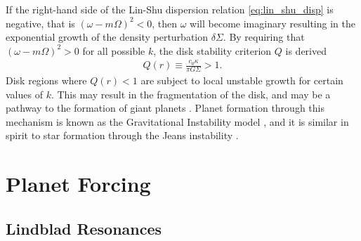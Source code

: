 If the right-hand side of the Lin-Shu dispersion relation \ref{eq:lin_shu_disp} is negative, that is $(\omega - m \Omega)^2 < 0$, then $\omega$ will become imaginary resulting in the exponential growth of the density perturbation $\delta \Sigma$.
By requiring that $(\omega - m \Omega)^2 > 0$ for all possible $k$, the disk stability criterion $Q$ is derived \citep{toomre1964}
\begin{align}
    Q(r) \equiv \frac{c_0 \kappa}{\pi G \Sigma} > 1.
\end{align}
Disk regions where $Q(r) < 1$ are subject to local unstable growth for certain values of $k$.
This may result in the fragmentation of the disk, and may be a pathway to the formation of giant planets \fct.
Planet formation through this mechanism is known as the Gravitational Instability model \fct, and it is similar in spirit to star formation through the Jeans instability \citep{jeans1902}.

\section{Planet Forcing}


\subsection{Lindblad Resonances}


